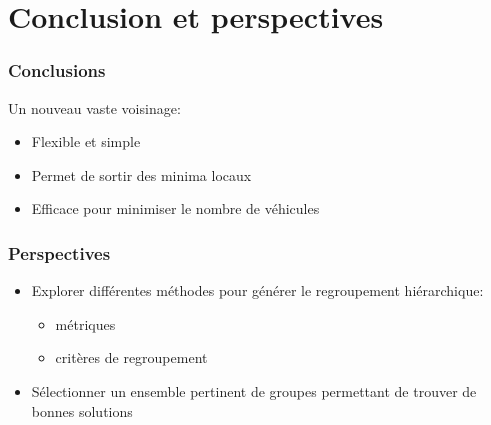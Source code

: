 \documentclass[table]{beamer}
\begin{document}
\section{Conclusion et perspectives}

\begin{frame}
  \frametitle{Conclusions}

  Un nouveau vaste voisinage:
  \begin{itemize}
  \item Flexible et simple
  \item Permet de sortir des minima locaux
  \item Efficace pour minimiser le nombre de véhicules
  \end{itemize}
\end{frame}

\begin{frame}
  \frametitle{Perspectives}

  \begin{itemize}
  \item Explorer différentes méthodes pour générer le regroupement
    hiérarchique:
    \begin{itemize}
    \item métriques
    \item critères de regroupement
    \end{itemize}
  \item Sélectionner un ensemble pertinent de groupes permettant de
    trouver de bonnes solutions
  \end{itemize}
\end{frame}

\begin{frame}
  \titlepage
\end{frame}
\end{document}
